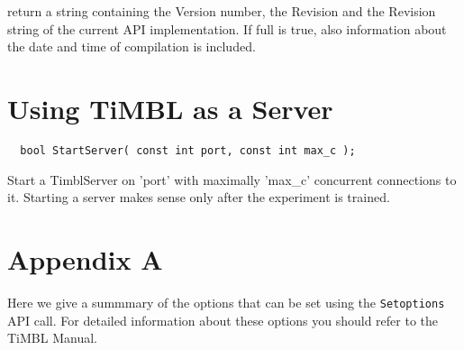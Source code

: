 return a string containing the Version number, the Revision and the
Revision string of the current API implementation. If full is true,
also information about the date and time of compilation is included.

\section{Using TiMBL as a Server}

\begin{footnotesize}
\begin{verbatim}
  bool StartServer( const int port, const int max_c );
\end{verbatim}
\end{footnotesize}

Start a TimblServer on 'port' with maximally 'max\_c' concurrent
connections to it. Starting a server makes sense only after the
experiment is trained.

\clearpage
\section{Appendix A}

Here we give a summmary of the options that can be set using the
{\tt Setoptions} API call. For detailed information about these options
you should refer to the TiMBL Manual.

